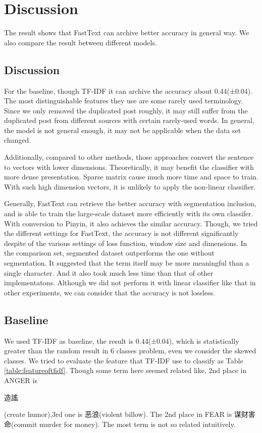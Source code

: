 \chapter{Discussion}

The result shows that FastText can archive better accuracy in general way. We also compare the result between different models.

\section{Discussion}


For the baseline, though TF-IDF it can archive the accuracy about 0.44(±0.04). 
The most distinguishable features they use are some rarely used terminology. 
Since we only removed the duplicated post roughly, it may still suffer from the duplicated post from different sources with certain rarely-used words. 
In general, the model is not general enough, it may not be applicable when the data set changed. 

Additionally, compared to other methods, those approaches convert the sentence to vectors with lower dimensions.
Theoretically, it may benefit the classifier with more dense presentation. Sparse matrix cause much more time and space to train.
With such high dimension vectors, it is unlikely to apply the non-linear classifier.

Generally, FastText can retrieve the better accuracy with segmentation inclusion, and is able to train the large-scale dataset more efficiently with its own classifer.
With conversion to Pinyin, it also achieves the similar accuracy. Though, we tried the different settings for FastText,
the accuracy is not different significantly despite of the various settings of loss function, window size and dimensions. 
In the comparison set, segmented dataset outperforms the one without segmentation. 
It suggested that the term itself may be more meaningful than a single character. And it also took much less time than that of other implementatons.
Although we did not perform it with linear classifier like that in other experiments, we can consider that the accuracy is not lossless.

\section{Baseline}

\begin{CJK}{UTF8}{gbsn}
We used TF-IDF as baseline, the result is 0.44(±0.04), which is statistically greater than the random result in 6 classes problem, 
even we consider the skewed classes.  We tried to evaluate the feature that TF-IDF use to classify as Table \ref{table:featureoftfidf}. 
Though some term here seemed related like, 2nd place in ANGER is \begin{CJK}{UTF8}{bkai}造謠\end{CJK} (create humor),3rd one is 恶浪(violent billow). 
The 2nd place in FEAR is 谋财害命(commit murder for money). The most term is not so related intuitively. 
\end{CJK}

